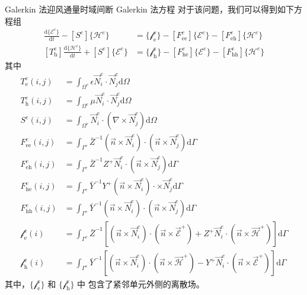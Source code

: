 \begin{theorem}{Galerkin 法}{迎风通量时域间断 Galerkin 法方程}
    对于该问题，我们可以得到如下方程组
    \begin{align}
        [T^e_{\text{e}}]\frac{\text{d}\{\mathscr{E}^e\}}{\text{d}t}
        -[S^e]\{\mathscr{H}^e\}
        &=\{\mathscr{f}^e_\text{e}\}
        -[F^e_{\text{ee}}]\{\mathscr{E}^e\}
        -[F^e_{\text{eh}}]\{\mathscr{H}^e\}\\
        [T^e_{\text{h}}]\frac{\text{d}\{\mathscr{H}^e\}}{\text{d}t}
        +[S^e]\{\mathscr{E}^e\}
        &=\{\mathscr{f}^e_\text{h}\}
        -[F^e_{\text{he}}]\{\mathscr{E}^e\}
        -[F^e_{\text{hh}}]\{\mathscr{H}^e\}
    \end{align}
    其中
    \begin{align}
        T^e_{\text{e}}(i,j)&=
        \int_{\Omega^e}\epsilon\vec{N}_i^e\cdot\vec{N}_j^e\text{d}\Omega\\
        T^e_{\text{h}}(i,j)&=
        \int_{\Omega^e}\mu\vec{N}_i^e\cdot\vec{N}_j^e\text{d}\Omega\\
        S^e(i,j)&=
        \int_{\Omega^e}
            \vec{N}_i^e\cdot(\nabla\times\vec{N}_j^e)
        \text{d}\Omega\\
        F^e_{\text{ee}}(i,j)&=
        \int_{\Gamma^e}
            \bar{Z}^{-1}
            (\vec{n}\times\vec{N}_i^e)\cdot(\vec{n}\times\vec{N}_j^e)
        \text{d}\Gamma\\
        F^e_{\text{eh}}(i,j)&=
        \int_{\Gamma^e}
            \bar{Z}^{-1}Z^+
            \vec{N}_i^e\cdot(\vec{n}\times\vec{N}_j^e)
        \text{d}\Gamma\\
        F^e_{\text{he}}(i,j)&=
        \int_{\Gamma^e}
            \bar{Y}^{-1}Y^+
            (\vec{n}\times\vec{N}_i^e)\cdot \times\vec{N}_j^e
        \text{d}\Gamma\\
        F^e_{\text{hh}}(i,j)&=
        \int_{\Gamma^e}
            \bar{Y}^{-1}
            (\vec{n}\times\vec{N}_i^e)\cdot(\vec{n}\times\vec{N}_j^e)
        \text{d}\Gamma\\
        \mathscr{f}^e_\text{e}(i)&=
        \int_{\Gamma^e}
            \bar{Z}^{-1}\left[
                (\vec{n}\times\vec{N}_i^e)\cdot
                (\vec{n}\times\vec{\mathscr{E}}^+)
                +Z^+\vec{N}_i^e\cdot(\vec{n}\times\vec{\mathscr{H}}^+)
            \right]
        \text{d}\Gamma\\
        \mathscr{f}^e_\text{h}(i)&=
        \int_{\Gamma^e}
            \bar{Y}^{-1}\left[
                (\vec{n}\times\vec{N}_i^e)\cdot
                (\vec{n}\times\vec{\mathscr{H}}^+)
                -Y^+\vec{N}_i^e\cdot(\vec{n}\times\vec{\mathscr{E}}^+)
            \right]
        \text{d}\Gamma
    \end{align}
    其中，$\{\mathscr{f}^e_\text{e}\}$ 和 $\{\mathscr{f}^e_\text{h}\}$ 中
    包含了紧邻单元外侧的离散场。
\end{theorem}

